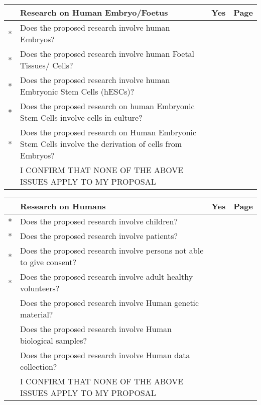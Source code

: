 \documentclass[a4paper,11pt]{article}
\begin{document}
\renewcommand{\tabularxcolumn}[1]{>{\arraybackslash}m{#1}}

\vspace{0.5cm}
\begin{tabularx}{\linewidth}{ | c | X | c | c | }
\rowcolor{black} & {\centering\arraybackslash \color{white} \bf Research on Human Embryo/Foetus} & {\color{white} \bf Yes} & {\color{white} \bf Page} \\ \hline
 * & Does the proposed research involve human Embryos?                                                      & & \\ \hline
 * & Does the proposed research involve human Foetal Tissues/ Cells?                                        & & \\ \hline
 * & Does the proposed research involve human Embryonic Stem Cells (hESCs)?                                 & & \\ \hline
 * & Does the proposed research on human Embryonic Stem Cells involve cells in culture?                     & & \\ \hline
 * & Does the proposed research on Human Embryonic Stem Cells involve the derivation of cells from Embryos? & & \\ \hline
   & I CONFIRM THAT NONE OF THE ABOVE ISSUES APPLY TO MY PROPOSAL                                           & & \cellcolor[gray]{0.8}\\ \hline 
\end{tabularx}

\vspace{0.5cm}
\begin{tabularx}{\linewidth}{ | c | X | c | c | }
\rowcolor{black} & {\centering\arraybackslash \color{white} \bf Research on Humans} & {\color{white} \bf Yes} & {\color{white} \bf Page} \\ \hline
 * & Does the proposed research involve children?                         & & \\ \hline
 * & Does the proposed research involve patients?                         & & \\ \hline
 * & Does the proposed research involve persons not able to give consent? & & \\ \hline
 * & Does the proposed research involve adult healthy volunteers?         & & \\ \hline
   & Does the proposed research involve Human genetic material?           & & \\ \hline
   & Does the proposed research involve Human biological samples?         & & \\ \hline
   & Does the proposed research involve Human data collection?            & & \\ \hline
   & I CONFIRM THAT NONE OF THE ABOVE ISSUES APPLY TO MY PROPOSAL         & & \cellcolor[gray]{0.8}\\ \hline 
\end{tabularx}
\end{document}
